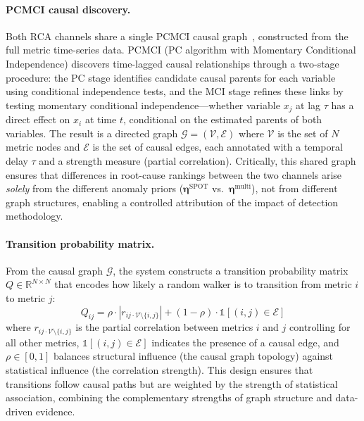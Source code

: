\documentclass[a4paper,fleqn]{cas-dc}
\begin{document}
\paragraph{PCMCI causal discovery.}
Both RCA channels share a single PCMCI causal graph~\cite{9213058}, constructed from the full metric time-series data.  PCMCI (PC algorithm with Momentary Conditional Independence) discovers time-lagged causal relationships through a two-stage procedure: the PC stage identifies candidate causal parents for each variable using conditional independence tests, and the MCI stage refines these links by testing momentary conditional independence---whether variable $x_j$ at lag $\tau$ has a direct effect on $x_i$ at time $t$, conditional on the estimated parents of both variables.  The result is a directed graph $\mathcal{G} = (\mathcal{V}, \mathcal{E})$ where $\mathcal{V}$ is the set of $N$ metric nodes and $\mathcal{E}$ is the set of causal edges, each annotated with a temporal delay $\tau$ and a strength measure (partial correlation).  Critically, this shared graph ensures that differences in root-cause rankings between the two channels arise \emph{solely} from the different anomaly priors ($\boldsymbol{\eta}^{\text{SPOT}}$ vs.\ $\boldsymbol{\eta}^{\text{multi}}$), not from different graph structures, enabling a controlled attribution of the impact of detection methodology.

\paragraph{Transition probability matrix.}
From the causal graph $\mathcal{G}$, the system constructs a transition probability matrix $Q \in \mathbb{R}^{N \times N}$ that encodes how likely a random walker is to transition from metric $i$ to metric $j$:
\begin{equation}
  Q_{ij} = \rho \cdot |r_{ij \cdot \mathcal{V} \setminus \{i,j\}}| + (1-\rho) \cdot \mathbb{1}[(i,j) \in \mathcal{E}]
  \label{eq:q_matrix}
\end{equation}
where $r_{ij \cdot \mathcal{V} \setminus \{i,j\}}$ is the partial correlation between metrics $i$ and $j$ controlling for all other metrics, $\mathbb{1}[(i,j) \in \mathcal{E}]$ indicates the presence of a causal edge, and $\rho \in [0,1]$ balances structural influence (the causal graph topology) against statistical influence (the correlation strength).  This design ensures that transitions follow causal paths but are weighted by the strength of statistical association, combining the complementary strengths of graph structure and data-driven evidence.
\end{document}
